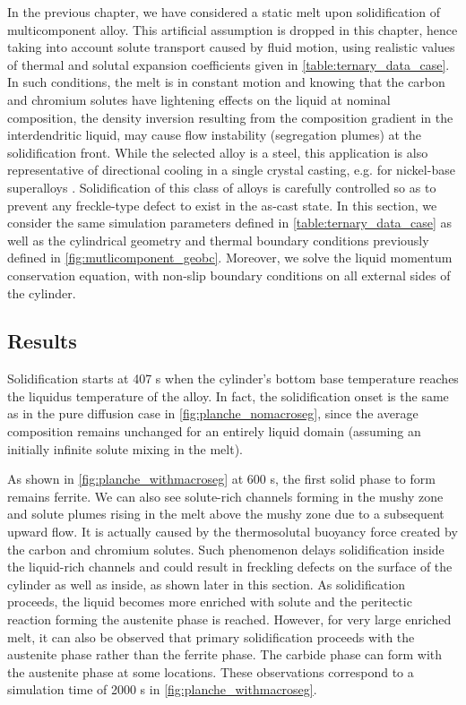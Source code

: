 In the previous chapter, we have considered a static melt upon solidification of multicomponent alloy. 
This artificial assumption is dropped in this chapter, hence taking into account solute transport 
caused by fluid motion, using realistic values of thermal and solutal expansion coefficients given in \cref{table:ternary_data_case}.
In such conditions, the melt is in constant motion and knowing that the carbon and chromium solutes have lightening effects on the liquid 
at nominal composition, the density inversion resulting from the composition gradient in the interdendritic 
liquid, may cause flow instability (segregation plumes) at the solidification front. While the selected alloy 
is a steel, this application is also representative of directional cooling in a single crystal casting, e.g. 
for nickel-base superalloys \citep{beckermann_development_2000}. Solidification of this class of alloys is carefully
controlled so as to prevent any freckle-type defect to exist in the as-cast state.
In this section, we consider the same simulation parameters defined in \cref{table:ternary_data_case} as well as the cylindrical geometry and thermal boundary conditions
previously defined in \cref{fig:mutlicomponent_geobc}. Moreover, we solve the liquid momentum conservation equation, with non-slip boundary conditions
on all external sides of the cylinder.

\subsection{Results}

Solidification starts at 407 s when the cylinder’s bottom base temperature 
reaches the liquidus temperature of the alloy. 
In fact, the solidification onset is the same as in the pure diffusion case in \cref{fig:planche_nomacroseg}, 
since the average composition remains unchanged for an entirely liquid domain (assuming an initially infinite 
solute mixing in the melt). 

As shown in \cref{fig:planche_withmacroseg} at 600 s, the first solid phase to form 
remains ferrite. We can also see solute-rich channels forming in the mushy zone and solute 
plumes rising in the melt above the mushy zone due to a subsequent upward flow. It is actually 
caused by the thermosolutal buoyancy force created by the carbon and chromium solutes. Such 
phenomenon delays solidification inside the liquid-rich channels and could result in freckling 
defects \citep{felicelli_simulation_1991} on the surface of the cylinder as well as inside, as shown later in this section. 
As solidification proceeds, the liquid becomes more enriched with solute and the peritectic 
reaction forming the austenite phase is reached. However, for very large enriched melt, it can 
also be observed that primary solidification proceeds with the austenite phase rather than the 
ferrite phase. The carbide phase can form with the austenite phase at some locations. These 
observations correspond to a simulation time of \num{2000} s in \cref{fig:planche_withmacroseg}. 

